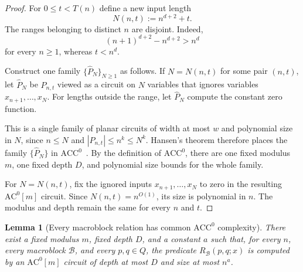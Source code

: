 \documentclass[11pt]{article}
\newtheorem{lemma}[theorem]{Lemma}
\theoremstyle{definition}
\newcommand{\ACC}{\mathrm{ACC}^{0}}
\newcommand{\ACm}[1]{\mathrm{AC}^{0}[#1]}
\newcommand{\cB}{\mathcal{B}}
\begin{document}
\begin{proof}
For $0\le t<T(n)$ define a new input length
\[
  N(n,t):=n^{d+2}+t.
\]
The ranges belonging to distinct $n$ are disjoint. Indeed,
\[
  (n+1)^{d+2}-n^{d+2}>n^d
\]
for every $n\ge 1$, whereas $t<n^d$.

Construct one family $\{\widehat P_N\}_{N\ge 1}$ as follows. If $N=N(n,t)$ for some pair $(n,t)$, let $\widehat P_N$ be $P_{n,t}$ viewed as a circuit on $N$ variables that ignores variables $x_{n+1},\ldots,x_N$. For lengths outside the range, let $\widehat P_N$ compute the constant zero function.

This is a single family of planar circuits of width at most $w$ and polynomial size in $N$, since $n\le N$ and $|P_{n,t}|\le n^k\le N^k$. Hansen's theorem therefore places the family $\{\widehat P_N\}$ in $\ACC$~\cite{Hansen2006}. By the definition of $\ACC$, there are one fixed modulus $m$, one fixed depth $D$, and polynomial size bounds for the whole family.

For $N=N(n,t)$, fix the ignored inputs $x_{n+1},\ldots,x_N$ to zero in the resulting $\ACm{m}$ circuit. Since $N(n,t)=n^{O(1)}$, its size is polynomial in $n$. The modulus and depth remain the same for every $n$ and $t$.
\end{proof}

\begin{lemma}[Every macroblock relation has common $\ACC$ complexity]\label{lem:block-relations}
There exist a fixed modulus $m$, fixed depth $D$, and a constant $a$ such that, for every $n$, every macroblock $\cB$, and every $p,q\in Q$, the predicate $R_{\cB}(p,q;x)$ is computed by an $\ACm{m}$ circuit of depth at most $D$ and size at most $n^a$.
\end{lemma}
\end{document}

